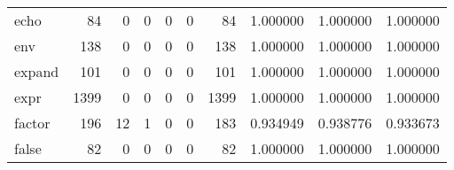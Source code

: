 \begin{longtable}{lrrrrrrrrr}
echo      &                                                 84 &                                                  0 &                                                  0 &                                                  0 &                                                  0 &                                                 84 &                                           1.000000 &                               1.000000 &                             1.000000 \\
env       &                                                138 &                                                  0 &                                                  0 &                                                  0 &                                                  0 &                                                138 &                                           1.000000 &                               1.000000 &                             1.000000 \\
expand    &                                                101 &                                                  0 &                                                  0 &                                                  0 &                                                  0 &                                                101 &                                           1.000000 &                               1.000000 &                             1.000000 \\
expr      &                                               1399 &                                                  0 &                                                  0 &                                                  0 &                                                  0 &                                               1399 &                                           1.000000 &                               1.000000 &                             1.000000 \\
factor    &                                                196 &                                                 12 &                                                  1 &                                                  0 &                                                  0 &                                                183 &                                           0.934949 &                               0.938776 &                             0.933673 \\
false     &                                                 82 &                                                  0 &                                                  0 &                                                  0 &                                                  0 &                                                 82 &                                           1.000000 &                               1.000000 &                             1.000000 \\

\end{longtable}

